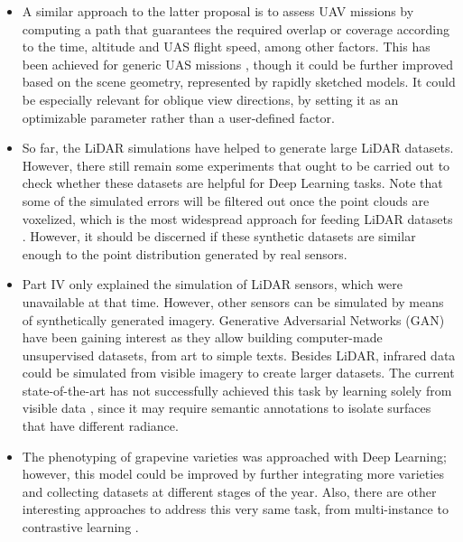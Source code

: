 \begin{itemize}
    \item A similar approach to the latter proposal is to assess UAV missions by computing a path that guarantees the required overlap or coverage according to the time, altitude and UAS flight speed, among other factors. This has been achieved for generic UAS missions \cite{pessacg_simplifying_2022}, though it could be further improved based on the scene geometry, represented by rapidly sketched models. It could be especially relevant for oblique view directions, by setting it as an optimizable parameter rather than a user-defined factor. 
    \item So far, the LiDAR simulations have helped to generate large LiDAR datasets. However, there still remain some experiments that ought to be carried out to check whether these datasets are helpful for Deep Learning tasks. Note that some of the simulated errors will be filtered out once the point clouds are voxelized, which is the most widespread approach for feeding LiDAR datasets \cite{hackel_semantic3d_2017, behley_towards_2021}. However, it should be discerned if these synthetic datasets are similar enough to the point distribution generated by real sensors. 
    \item Part IV only explained the simulation of LiDAR sensors, which were unavailable at that time. However, other sensors can be simulated by means of synthetically generated imagery. Generative Adversarial Networks (GAN) have been gaining interest as they allow building computer-made unsupervised datasets, from art to simple texts. Besides LiDAR, infrared data could be simulated from visible imagery to create larger datasets. The current state-of-the-art has not successfully achieved this task by learning solely from visible data \cite{li_multi-branch_2019, li_i-gans_2021, kniaz_thermalgan_2019, ozkanoglu_infragan_2022, yi_cycle_2023}, since it may require semantic annotations to isolate surfaces that have different radiance. 
    \item The phenotyping of grapevine varieties was approached with Deep Learning; however, this model could be improved by further integrating more varieties and collecting datasets at different stages of the year. Also, there are other interesting approaches to address this very same task, from multi-instance \cite{meerdink_multitarget_2022} to contrastive learning \cite{guan_spatial-spectral_2022}. 
\end{itemize}

